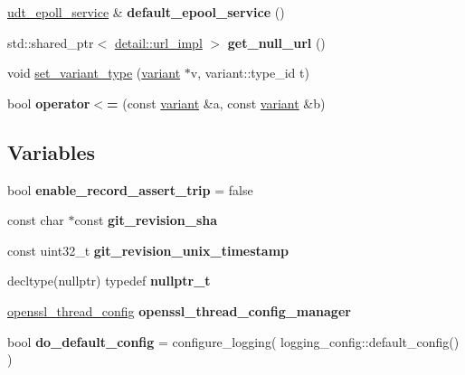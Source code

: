 \begin{DoxyCompactItemize}
\mbox{\label{namespacefc_a73da729a5a12ca6da5402feced2d5ac1}} 
\mbox{\hyperlink{classfc_1_1udt__epoll__service}{udt\+\_\+epoll\+\_\+service}} \& {\bfseries default\+\_\+epool\+\_\+service} ()
\item 
\mbox{\label{namespacefc_a66f7e103ac60d310c75be32ca9eae7c1}} 
std\+::shared\+\_\+ptr$<$ \mbox{\hyperlink{classfc_1_1detail_1_1url__impl}{detail\+::url\+\_\+impl}} $>$ {\bfseries get\+\_\+null\+\_\+url} ()
\item 
void \mbox{\hyperlink{namespacefc_a101ffbbefd2ddbb23eea290bbe9f87a1}{set\+\_\+variant\+\_\+type}} (\mbox{\hyperlink{classfc_1_1variant}{variant}} $\ast$v, variant\+::type\+\_\+id t)
\item 
\mbox{\label{namespacefc_a42cef2f92964d6db67357a06d7acccbe}} 
bool {\bfseries operator$<$=} (const \mbox{\hyperlink{classfc_1_1variant}{variant}} \&a, const \mbox{\hyperlink{classfc_1_1variant}{variant}} \&b)
\end{DoxyCompactItemize}
\subsection*{Variables}
\begin{DoxyCompactItemize}
\item 
\mbox{\label{namespacefc_a3cc0ae501000dcf3ad7ad8124b985b05}} 
bool {\bfseries enable\+\_\+record\+\_\+assert\+\_\+trip} = false
\item 
\mbox{\label{namespacefc_a4f854ac27726fd97dac06554cc368e8f}} 
const char $\ast$const {\bfseries git\+\_\+revision\+\_\+sha}
\item 
\mbox{\label{namespacefc_a0a92e49b2dffa85ef9c6264e493e70b0}} 
const uint32\+\_\+t {\bfseries git\+\_\+revision\+\_\+unix\+\_\+timestamp}
\item 
\mbox{\label{namespacefc_a3171a74695a9a609753dd4604825d0ca}} 
decltype(nullptr) typedef {\bfseries nullptr\+\_\+t}
\item 
\mbox{\label{namespacefc_a395c1448795f686a45a9a153caecca25}} 
\mbox{\hyperlink{structfc_1_1openssl__thread__config}{openssl\+\_\+thread\+\_\+config}} {\bfseries openssl\+\_\+thread\+\_\+config\+\_\+manager}
\item 
\mbox{\label{namespacefc_a09b72f5710fe4238d40356661996b8b6}} 
bool {\bfseries do\+\_\+default\+\_\+config} = configure\+\_\+logging( logging\+\_\+config\+::default\+\_\+config() )
\end{DoxyCompactItemize}



